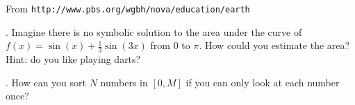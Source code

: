 \begin{marginfigure}[-1.8in]
\begin{center}
\end{center}
\caption{\tiny From  {\tt http://www.pbs.org/wgbh/nova/education/earth}}
\end{marginfigure}

\vspace{15mm}

.  Imagine there is no symbolic solution to the area under the curve of $f(x) = \sin(x) + \frac{1}{3} \sin(3x)$ from $0$ to $\pi$. How could you estimate the area? Hint: do you like playing darts?

\begin{marginfigure}
\begin{center}
\end{center}
\end{marginfigure}

\vspace{20mm}

.  How can you sort $N$ numbers in $[0,M]$ if you can only look at each number once?

